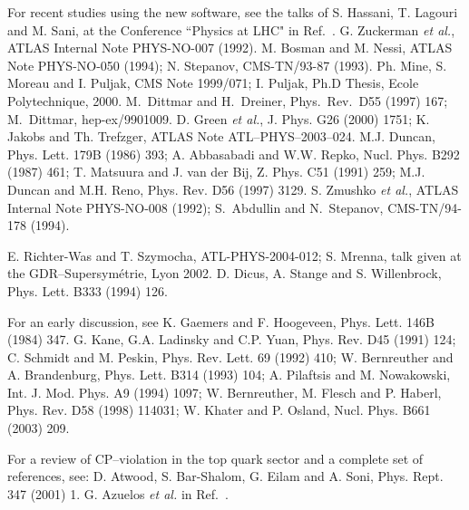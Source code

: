 \begin{thebibliography}{999}
For recent studies using the new software, see the talks of S. Hassani, T. 
Lagouri and M. Sani, at the Conference ``Physics at LHC" in Ref.~\cite{Vienna}.
G. Zuckerman {\it et al.}, ATLAS Internal Note PHYS-NO-007 (1992). 
M. Bosman and M. Nessi, ATLAS Note PHYS-NO-050 (1994);
N. Stepanov, CMS-TN/93-87 (1993). 
%
Ph. Mine, S. Moreau and I. Puljak, CMS Note 1999/071; 
I. Puljak, Ph.D Thesis, Ecole Polytechnique, 2000. 
%
 M.~Dittmar and H.~Dreiner, Phys.\ Rev.\ D55 (1997) 167;
M.~Dittmar, hep-ex/9901009.
%
 D. Green {\it et al.}, J. Phys. G26 (2000) 1751;
K. Jakobs and Th. Trefzger, ATLAS Note ATL--PHYS--2003--024. 
%
 M.J. Duncan, Phys. Lett. 179B (1986) 393;    
A. Abbasabadi and W.W. Repko, Nucl. Phys. B292 (1987) 461; 
T. Matsuura and J. van der Bij, Z. Phys. C51 (1991) 259; 
M.J. Duncan and M.H. Reno, Phys. Rev. D56 (1997) 3129.  
%
 S. Zmushko {\it et al.}, ATLAS Internal Note 
PHYS-NO-008 (1992); S.~Abdullin and  N.~Stepanov, CMS-TN/94-178 (1994).   

 E. Richter-Was and T. Szymocha, ATL-PHYS-2004-012; 
S. Mrenna, talk given at the GDR--Supersym\'etrie, Lyon 2002. 
%
 D. Dicus, A. Stange and S. Willenbrock, Phys. Lett. B333 
(1994) 126. 

 For an early discussion, see K. Gaemers and F. Hoogeveen, 
Phys. Lett. 146B (1984) 347. 
%
 G. Kane, G.A. Ladinsky and C.P. Yuan, Phys. Rev. D45 (1991) 
124; C. Schmidt and M. Peskin, Phys. Rev. Lett. 69 (1992) 410;   
W. Bernreuther and A. Brandenburg, Phys. Lett. B314 (1993) 104; 
A. Pilaftsis and M. Nowakowski, Int. J. Mod. Phys. A9 (1994) 1097; 
W. Bernreuther, M. Flesch and P. Haberl, Phys. Rev. D58 (1998) 114031; 
W. Khater and P. Osland, Nucl. Phys. B661 (2003) 209. 

 For a review of CP--violation in the top quark sector
and a complete set of references, see: 
D. Atwood, S. Bar-Shalom, G. Eilam and A. Soni, Phys. Rept. 347 (2001) 1.   
%
 G. Azuelos {\it et al.} in Ref.~\cite{Houches2001}. 


\end{thebibliography}
